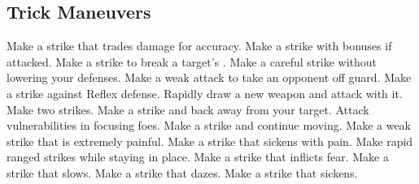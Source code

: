 \small
\subsection{Trick Maneuvers}\label{Trick Maneuvers}
\begin{spelllist}
 Make a strike that trades damage for accuracy.
 Make a strike with bonuses if attacked.
 Make a strike to break a target's .
 Make a careful strike without lowering your defenses.
 Make a weak attack to take an opponent off guard.
 Make a strike against Reflex defense.
 Rapidly draw a new weapon and attack with it.
 Make two strikes.
 Make a strike and back away from your target.
 Attack vulnerabilities in focusing foes.
 Make a strike and continue moving.
 Make a weak strike that is extremely painful.
 Make a strike that sickens with pain.
 Make rapid ranged strikes while staying in place.
 Make a strike that inflicts fear.
 Make a strike that slows.
 Make a strike that dazes.
 Make a strike that sickens.
\end{spelllist}



\small

